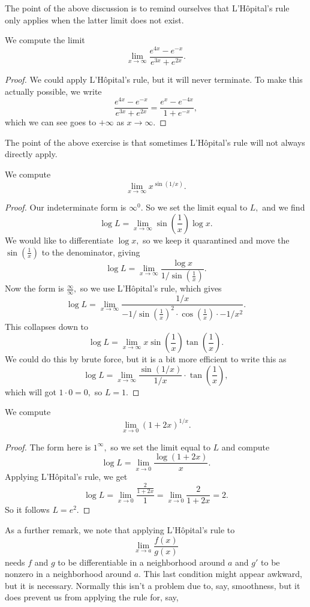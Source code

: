 \documentclass[../notes.tex]{subfiles}
\begin{document}
The point of the above discussion is to remind ourselves that L'H\^opital's rule only applies when the latter limit does not exist.
\begin{exercise}
	We compute the limit
	\[\lim_{x\to\infty}\frac{e^{4x}-e^{-x}}{e^{3x}+e^{2x}}.\]
\end{exercise}
\begin{proof}
	We could apply L'H\^opital's rule, but it will never terminate. To make this actually possible, we write
	\[\frac{e^{4x}-e^{-x}}{e^{3x}+e^{2x}}=\frac{e^{x}-e^{-4x}}{1+e^{-x}},\]
	which we can see goes to $\boxed{+\infty}$ as $x\to\infty.$
\end{proof}
The point of the above exercise is that sometimes L'H\^opital's rule will not always directly apply.
\begin{exercise}
	We compute
	\[\lim_{x\to\infty}x^{\sin(1/x)}.\]
\end{exercise}
\begin{proof}
	Our indeterminate form is $\infty^0.$ So we set the limit equal to $L,$ and we find
	\[\log L=\lim_{x\to\infty}\sin\left(\frac1x\right)\log x.\]
	We would like to differentiate $\log x,$ so we keep it quarantined and move the $\sin\left(\frac1x\right)$ to the denominator, giving
	\[\log L=\lim_{x\to\infty}\frac{\log x}{1/\sin\left(\frac1x\right)}.\]
	Now the form is $\frac\infty\infty,$ so we use L'H\^opital's rule, which gives
	\[\log L=\lim_{x\to\infty}\frac{1/x}{-1/\sin\left(\frac1x\right)^2\cdot\cos\left(\frac1x\right)\cdot-1/x^2}.\]
	This collapses down to
	\[\log L=\lim_{x\to\infty}x\sin\left(\frac1x\right)\tan\left(\frac1x\right).\]
	We could do this by brute force, but it is a bit more efficient to write this as
	\[\log L=\lim_{x\to\infty}\frac{\sin\left(1/x\right)}{1/x}\cdot\tan\left(\frac1x\right),\]
	which will got $1\cdot0=0,$ so $L=\boxed1.$
\end{proof}
\begin{exercise}
	We compute
	\[\lim_{x\to0}(1+2x)^{1/x}.\]
\end{exercise}
\begin{proof}
	The form here is $1^\infty,$ so we set the limit equal to $L$ and compute
	\[\log L=\lim_{x\to0}\frac{\log(1+2x)}x.\]
	Applying L'H\^opital's rule, we get
	\[\log L=\lim_{x\to0}\frac{\frac{2}{1+2x}}1=\lim_{x\to0}\frac2{1+2x}=2.\]
	So it follows $L=\boxed{e^2}.$
\end{proof}
As a further remark, we note that applying L'H\^opital's rule to
\[\lim_{x\to a}\frac{f(x)}{g(x)}\]
needs $f$ and $g$ to be differentiable in a neighborhood around $a$ and $g'$ to be nonzero in a neighborhood around $a.$ This last condition might appear awkward, but it is necessary. Normally this isn't a problem due to, say, smoothness, but it does prevent us from applying the rule for, say,
\end{document}

